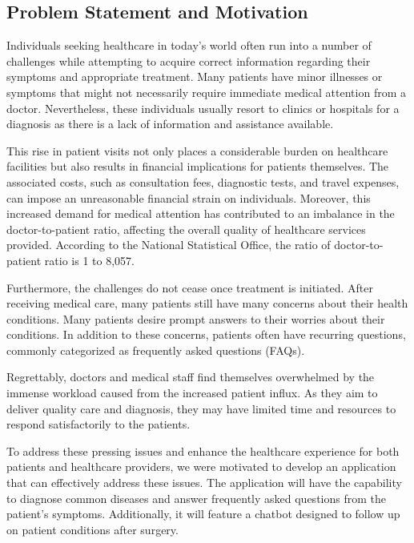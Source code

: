 \documentclass[12pt,oneside,openright,a4paper]{cpe-english-project}
\begin{document}
  \subsection{Problem Statement and Motivation}
    \qquad Individuals seeking healthcare in today's world often run into a number of challenges while attempting to acquire correct information regarding their symptoms and appropriate treatment. Many patients have minor illnesses or symptoms that might not necessarily require immediate medical attention from a doctor. Nevertheless, these individuals usually resort to clinics or hospitals for a diagnosis as there is a lack of information and assistance available. \par
    \qquad This rise in patient visits not only places a considerable burden on healthcare facilities but also results in financial implications for patients themselves. The associated costs, such as consultation fees, diagnostic tests, and travel expenses, can impose an unreasonable financial strain on individuals. Moreover, this increased demand for medical attention has contributed to an imbalance in the doctor-to-patient ratio, affecting the overall quality of healthcare services provided. According to the National Statistical Office, the ratio of doctor-to-patient ratio is 1 to 8,057.\par
    \qquad Furthermore, the challenges do not cease once treatment is initiated. After receiving medical care, many patients still have many concerns about their health conditions. Many patients desire prompt answers to their worries about their conditions. In addition to these concerns, patients often have recurring questions, commonly categorized as frequently asked questions (FAQs).\par
    \qquad Regrettably, doctors and medical staff find themselves overwhelmed by the immense workload caused from the increased patient influx. As they aim to deliver quality care and diagnosis, they may have limited time and resources to respond satisfactorily to the patients.\par
    \qquad To address these pressing issues and enhance the healthcare experience for both patients and healthcare providers, we were motivated to develop an application that can effectively address these issues. The application will have the capability to diagnose common diseases and answer frequently asked questions from the patient's symptoms. Additionally, it will feature a chatbot designed to follow up on patient conditions after surgery.\par
\end{document}
